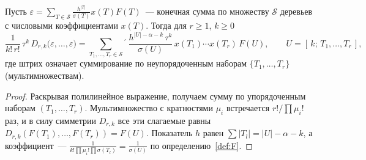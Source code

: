 \begin{lemma}\label{lem:subst}
Пусть $\varepsilon=\sum_{T\in\mathcal S}\frac{h^{|T|}}{\sigma(T)}x(T)F(T)$~--- конечная сумма по множеству $\mathcal S$ деревьев с числовыми коэффициентами $x(T)$. Тогда для $r\ge1$, $k\ge0$
\[
\frac{1}{k!\,r!}\,\tau^k\,D_{r,k}\bigl(\varepsilon,\dots,\varepsilon\bigr)
=\sum_{T_1,\dots,T_r\in\mathcal S}{}^{'}\ \frac{h^{|U|-\alpha-k}\,\tau^k}{\sigma(U)}\,x(T_1)\cdots x(T_r)\,F(U),\qquad U=[\,k;\,T_1,\dots,T_r\,],
\]
где штрих означает суммирование по неупорядоченным наборам $\{T_1,\dots,T_r\}$ (мультимножествам).
\end{lemma}
\begin{proof}
Раскрывая полилинейное выражение, получаем сумму по упорядоченным наборам $(T_1,\dots,T_r)$. Мультимножество с кратностями $\mu_i$ встречается $r!/\prod\mu_i!$ раз, и в силу симметрии $D_{r,k}$ все эти слагаемые равны $D_{r,k}(F(T_1),\dots,F(T_r))=F(U)$. Показатель $h$ равен $\sum|T_l|=|U|-\alpha-k$, а коэффициент~--- $\frac{1}{k!\prod\mu_i!\prod\sigma(T_l)}=\frac{1}{\sigma(U)}$ по определению~\ref{def:F}.
\end{proof}

